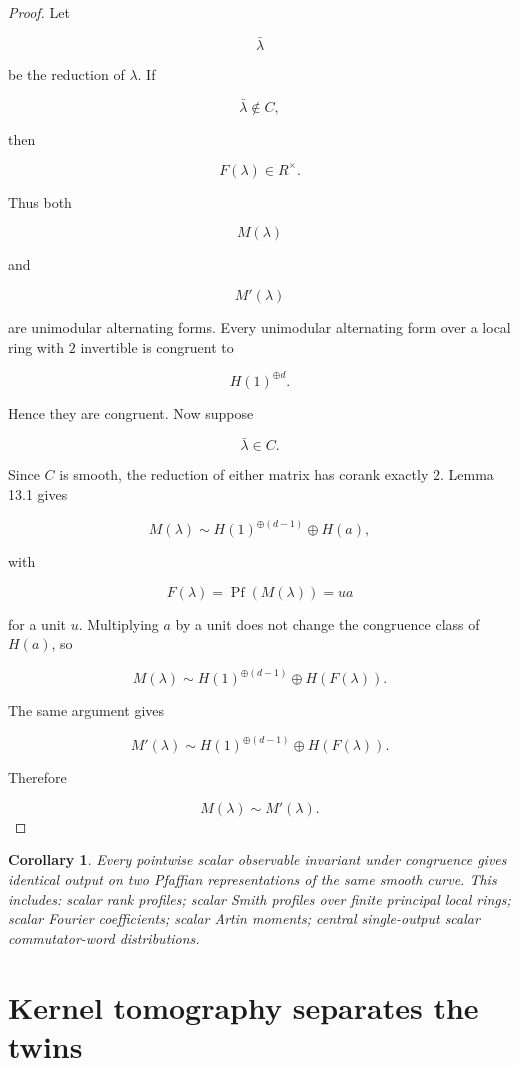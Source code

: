 \documentclass[11pt]{article}
\newtheorem{corollary}[theorem]{Corollary}
\begin{document}
\begin{proof}
Let

\[
\bar\lambda
\]

be the reduction of $\lambda$. If

\[
\bar\lambda\notin C,
\]

then

\[
F(\lambda)\in R^\times.
\]

Thus both

\[
M(\lambda)
\]

and

\[
M'(\lambda)
\]

are unimodular alternating forms. Every unimodular alternating form over a local ring with $2$ invertible is congruent to

\[
H(1)^{\oplus d}.
\]

Hence they are congruent. Now suppose

\[
\bar\lambda\in C.
\]

Since $C$ is smooth, the reduction of either matrix has corank exactly $2$. Lemma 13.1 gives

\[
M(\lambda)
\sim
H(1)^{\oplus(d-1)}\oplus H(a),
\]

with

\[
F(\lambda)=\operatorname{Pf}(M(\lambda))=u a
\]

for a unit $u$. Multiplying $a$ by a unit does not change the congruence class of $H(a)$, so

\[
M(\lambda)
\sim
H(1)^{\oplus(d-1)}\oplus H(F(\lambda)).
\]

The same argument gives

\[
M'(\lambda)
\sim
H(1)^{\oplus(d-1)}\oplus H(F(\lambda)).
\]

Therefore

\[
M(\lambda)\sim M'(\lambda).
\]

\end{proof}

\begin{corollary}
Every pointwise scalar observable invariant under congruence gives identical output on two Pfaffian representations of the same smooth curve. This includes: scalar rank profiles; scalar Smith profiles over finite principal local rings; scalar Fourier coefficients; scalar Artin moments; central single-output scalar commutator-word distributions.

\end{corollary}

\section{Kernel tomography separates the twins}
\end{document}
